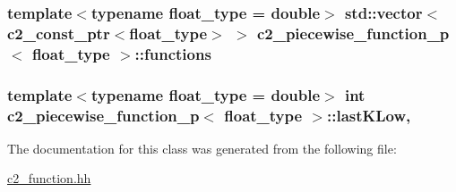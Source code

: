 \subsubsection[{\texorpdfstring{functions}{functions}}]{\setlength{\rightskip}{0pt plus 5cm}template$<$typename float\+\_\+type = double$>$ std\+::vector$<${\bf c2\+\_\+const\+\_\+ptr}$<$float\+\_\+type$>$ $>$ {\bf c2\+\_\+piecewise\+\_\+function\+\_\+p}$<$ float\+\_\+type $>$\+::functions\hspace{0.3cm}{\ttfamily [protected]}}\hypertarget{classc2__piecewise__function__p_aa408053c36b9fa349a5ea9b0b4badc0d}{}\label{classc2__piecewise__function__p_aa408053c36b9fa349a5ea9b0b4badc0d}
\subsubsection[{\texorpdfstring{last\+K\+Low}{lastKLow}}]{\setlength{\rightskip}{0pt plus 5cm}template$<$typename float\+\_\+type = double$>$ int {\bf c2\+\_\+piecewise\+\_\+function\+\_\+p}$<$ float\+\_\+type $>$\+::last\+K\+Low\hspace{0.3cm}{\ttfamily [mutable]}, {\ttfamily [protected]}}\hypertarget{classc2__piecewise__function__p_a8231d5c512db23c48712b7cba0ea0bca}{}\label{classc2__piecewise__function__p_a8231d5c512db23c48712b7cba0ea0bca}


The documentation for this class was generated from the following file\+:\begin{DoxyCompactItemize}
\item 
\hyperlink{c2__function_8hh}{c2\+\_\+function.\+hh}\end{DoxyCompactItemize}
